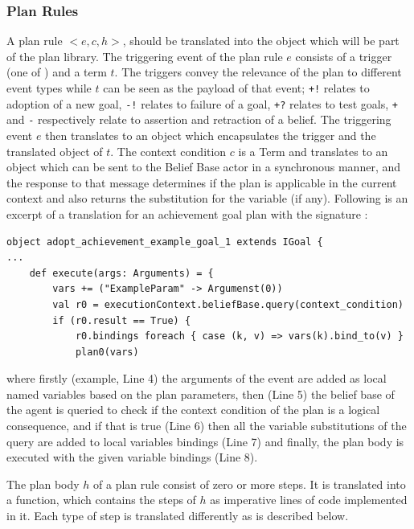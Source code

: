 \subsubsection{Plan Rules}
A plan rule $<e,c,h>$, should be translated into the object  which will be part of the plan library. The triggering event of the plan rule $e$ consists of a trigger (one of ) and a term $t$. The triggers convey the relevance of the plan to different event types while $t$ can be seen as the payload of that event; \verb#+!# relates to adoption of a new goal, \verb#-!# relates to failure of a goal, \verb#+?# relates to test goals, \verb#+# and \verb#-# respectively relate to assertion and retraction of a belief. The triggering event $e$ then translates to an  object which encapsulates the trigger and the translated  object of $t$. The context condition $c$ is a Term and translates to an  object which can be sent to the Belief Base actor in a synchronous manner, and the response to that message determines if the plan is applicable in the current context and also returns the substitution for the variable (if any). Following is an excerpt of a translation for an achievement goal plan with the signature :
\begin{verbatim}
object adopt_achievement_example_goal_1 extends IGoal {
...
    def execute(args: Arguments) = {
        vars += ("ExampleParam" -> Argumenst(0))
        val r0 = executionContext.beliefBase.query(context_condition)
        if (r0.result == True) {
            r0.bindings foreach { case (k, v) => vars(k).bind_to(v) }
            plan0(vars)
\end{verbatim}
\noindent where firstly (example, Line 4) the arguments of the event are added as local named variables based on the plan parameters, then (Line 5) the belief base of the agent is queried to check if the context condition of the plan is a logical consequence, and if that is true (Line 6) then all the variable substitutions of the query are added to local variables bindings (Line 7) and finally, the plan body is executed with the given variable bindings (Line 8). 


The plan body $h$ of a plan rule consist of zero or more steps. %
It is translated into a function, which contains the steps of $h$ as imperative lines of code implemented in it. Each type of step is translated differently as is described below. 



